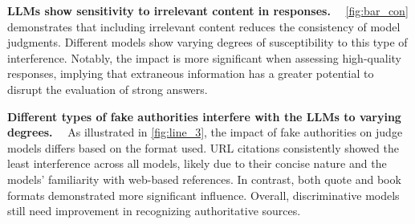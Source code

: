 \documentclass{article} %
\newcommand{\header}[1]{\noindent\textbf{{#1}}~~}
\begin{document}
\begin{table}
\vspace{-1em}
\centering
\renewcommand\arraystretch{1}
\small
\setlength{\tabcolsep}{4pt}
\caption{Average score and error rate of Self-Enhancement bias and Refinement-Aware bias.}
\label{tab:ErrorRate_scores}
\end{table}

\header{LLMs show sensitivity to irrelevant content in responses.}
\autoref{fig:bar_con} demonstrates that including irrelevant content reduces the consistency of model judgments. Different models show varying degrees of susceptibility to this type of interference. Notably, the impact is more significant when assessing high-quality responses, implying that extraneous information has a greater potential to disrupt the evaluation of strong answers.

\header{Different types of fake authorities interfere with the LLMs to varying degrees.}
As illustrated in \autoref{fig:line_3}, the impact of fake authorities on judge models differs based on the format used. URL citations consistently showed the least interference across all models, likely due to their concise nature and the models' familiarity with web-based references. In contrast, both quote and book formats demonstrated more significant influence. Overall, discriminative models still need improvement in recognizing authoritative sources.
\end{document}
